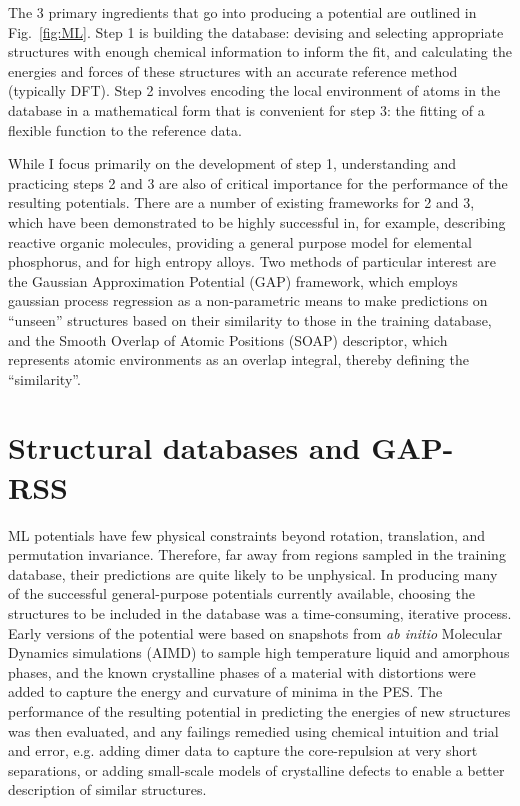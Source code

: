 \documentclass[12pt,a4paper,twoside,nobind]{ociamthesis}
\begin{document}
The 3 primary ingredients that go into producing a potential are outlined in Fig.\ \ref{fig:ML}.
Step 1 is building the database:
devising and selecting appropriate structures with enough chemical information to inform the fit,
and calculating the energies and forces of these structures with an accurate reference method (typically DFT).
Step 2 involves encoding the 
local environment of atoms in the database in a mathematical form that is convenient for step 3: the fitting of a flexible function to the reference data.

While I focus primarily on the development of step 1, understanding and practicing steps 2 and 3 are also of critical importance for the performance of the resulting potentials.
There are a number of existing frameworks for 2 and 3, which have been demonstrated to be highly successful in, for example,
describing reactive organic molecules\autocite{Ko2021a}, providing a general purpose model for elemental phosphorus\autocite{Deringer2020c}, and for high entropy alloys.\autocite{Kostiuchenko2019} 
Two methods of particular interest are the Gaussian Approximation Potential (GAP) framework,\autocite{Bartok2010} which employs gaussian process regression as a non-parametric means
to make predictions on ``unseen'' structures based on their similarity to those in the training database,
and the Smooth Overlap of Atomic Positions (SOAP) descriptor,\autocite{Bartok2013} which represents atomic environments as an overlap integral, thereby defining the ``similarity''.

\section{Structural databases and GAP-RSS}

ML potentials have few physical constraints beyond rotation, translation, and permutation invariance.
Therefore, far away from regions sampled in the training database, their predictions are quite likely to be unphysical.
In producing many of the successful general-purpose potentials currently available, choosing the structures to be included in the database was a time-consuming, iterative process.
Early versions of the potential were based on snapshots from \textit{ab initio} Molecular Dynamics simulations (AIMD) to sample high temperature liquid and amorphous phases, and
the known crystalline phases of a material with distortions were added to capture the energy and curvature of minima in the PES. The performance of the resulting potential in predicting the energies
of new structures was then evaluated, and any failings remedied using chemical intuition and trial and error, e.g. adding dimer data to capture the core-repulsion at very short separations,
or adding small-scale models of crystalline defects to enable a better description of similar structures. 
\end{document}
